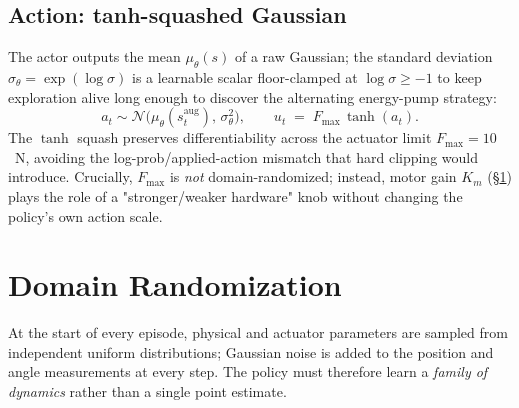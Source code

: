 \documentclass[11pt,a4paper]{article}
\begin{document}
\subsection{Action: tanh-squashed Gaussian}
The actor outputs the mean $\mu_\theta(s)$ of a raw Gaussian; the standard deviation $\sigma_\theta = \exp(\log\sigma)$ is a learnable scalar floor-clamped at $\log\sigma \geq -1$ to keep exploration alive long enough to discover the alternating energy-pump strategy:
\begin{equation}
a_t \sim \mathcal{N}\!\bigl(\mu_\theta(s^{\text{aug}}_t),\, \sigma_\theta^2\bigr),
\qquad
u_t \;=\; F_{\max}\,\tanh(a_t).
\end{equation}
The $\tanh$ squash preserves differentiability across the actuator limit $F_{\max} = 10$~N, avoiding the log-prob/applied-action mismatch that hard clipping would introduce. Crucially, $F_{\max}$ is \emph{not} domain-randomized; instead, motor gain $K_m$ (\S\ref{sec:dr}) plays the role of a "stronger/weaker hardware" knob without changing the policy's own action scale.

\section{Domain Randomization}
\label{sec:dr}

At the start of every episode, physical and actuator parameters are sampled
from independent uniform distributions; Gaussian noise is added to the
position and angle measurements at every step. The policy must therefore
learn a \emph{family of dynamics} rather than a single point estimate.
\end{document}
